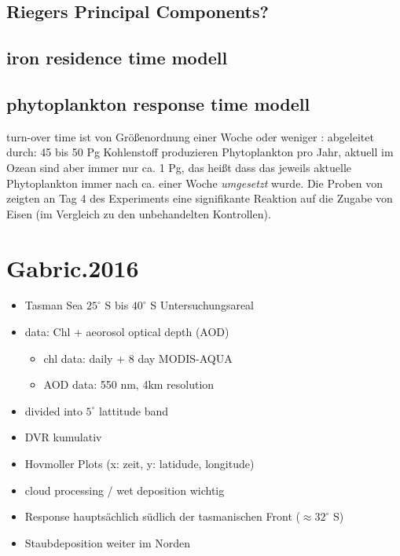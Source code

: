 \documentclass[12pt,a4paper,onecolumn,draft]{scrartcl}
\begin{document}
\subsection{Riegers Principal Components?}
\subsection{iron residence time modell}
\subsection{phytoplankton response time modell}
turn-over time ist von Größenordnung einer Woche oder weniger \citep{Falkowski.1998}: abgeleitet durch: 45 bis 50 Pg Kohlenstoff produzieren Phytoplankton pro Jahr, aktuell im Ozean sind aber immer nur ca. 1 Pg, das heißt dass das jeweils aktuelle Phytoplankton immer nach ca. einer Woche \textit{umgesetzt} wurde. Die Proben von \citet{Martin.1988} zeigten an Tag 4 des Experiments eine signifikante Reaktion auf die Zugabe von Eisen (im Vergleich zu den unbehandelten Kontrollen).



\section{Gabric.2016}

\begin{itemize}
\item Tasman Sea $25^\circ$ S bis $40^\circ$ S Untersuchungsareal
\item data: Chl + aeorosol optical depth (AOD)
\begin{itemize}
\item chl data: daily + 8 day MODIS-AQUA
\item AOD data: 550 nm, 4km resolution
\end{itemize}
\item divided into $5^\circ$ lattitude band
\item DVR kumulativ
\item Hovmoller Plots (x: zeit, y: latidude, longitude)
\item cloud processing / wet deposition wichtig
\item Response hauptsächlich südlich der tasmanischen Front ($\approx 32^\circ$ S)
\item Staubdeposition weiter im Norden
\end{itemize}
\end{document}
